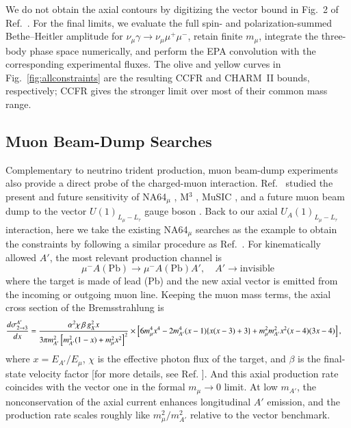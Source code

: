 \documentclass[onecolumn, aps, nofootinbib, prd, preprint, floats, floatfix, amsmath, amssymb, superscriptaddress, preprintnumbers]{revtex4-2}
\begin{document}
We do not obtain the axial contours by digitizing the vector bound in Fig.~2 of Ref.~\cite{Altmannshofer:2014pba}. For the final limits, we evaluate the full spin- and polarization-summed Bethe--Heitler amplitude for $\nu_\mu\gamma\to\nu_\mu\mu^+\mu^-$, retain finite $m_\mu$, integrate the three-body phase space numerically, and perform the EPA convolution with the corresponding experimental fluxes. The olive and yellow curves in Fig.~\ref{fig:allconstraints} are the resulting CCFR and CHARM~II bounds, respectively; CCFR gives the stronger limit over most of their common mass range.


\subsection{Muon Beam-Dump Searches}
\label{subsec:muon-beam-dump}

Complementary to neutrino trident production, muon beam-dump experiments also provide a direct probe of the charged-muon interaction. Ref.~\cite{Chakraborty:2025jbd} studied the present and future sensitivity of NA64$_\mu$ \cite{NA64:2024nwj}, M$^3$ \cite{Kahn:2018cqs}, MuSIC \cite{Acosta:2021qpx,Acosta:2022ejc}, and a future muon beam dump to the vector $U(1)_{L_\mu-L_\tau}$ gauge boson \cite{Cesarotti:2022ttv}. Back to our axial $U_A(1)_{L_\mu-L_\tau}$ interaction, here we take the existing NA64$_\mu$ searches as the example to obtain the constraints by following a similar procedure as Ref.~\cite{Chakraborty:2025jbd}.
For kinematically allowed $A'$, the most relevant production channel is
\begin{equation}
\mu^- A(\text{Pb}) \to \mu^- A(\text{Pb}) A', \quad A' \to \text{invisible}
\label{eq:NA64production}
\end{equation}
where the target is made of lead (Pb) \cite{andreev2024exploration} and the new axial vector is emitted from the incoming or outgoing muon line. 
Keeping the muon mass terms, the axial cross section of the Bremsstrahlung is \cite{Chakraborty:2025jbd}
\begin{equation}
\begin{aligned}
\small
\frac{d\sigma^{A'}_{2\to 3}}{dx}
&=\frac{\alpha^2\chi\,\beta\,g_X^2 x}{3\pi m_{A'}^2\left[m_{A'}^2(1-x)+m_\mu^2x^2\right]^2} \times\left[ 6m_\mu^4x^4 -2m_{A'}^4(x-1)\{x(x-3)+3\} +m_\mu^2m_{A'}^2x^2(x-4)(3x-4) \right],
\label{eq:beamdump-axial-spectrum}
\end{aligned}
\end{equation}
where $x=E_{A'}/E_\mu$, $\chi$ is the effective photon flux of the target, and $\beta$ is the final-state velocity factor [for more details, see Ref. \cite{Chakraborty:2025jbd}].
And this axial production rate coincides with the vector one in the formal $m_\mu\to0$ limit. At low $m_{A'}$, the nonconservation of the axial current enhances longitudinal $A'$ emission, and the production rate scales roughly like $m_\mu^2/m_{A'}^2$ relative to the vector benchmark.
\end{document}
